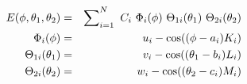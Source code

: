 \documentclass[12pt]{article}
\begin{document}
\pagestyle{empty}
\begin{eqnarray*}
E(\phi,\theta_1,\theta_2) & = &\sum_{i=1}^N\nolimits\ C_i\ \Phi_i(\phi)\ \Theta_{1i}(\theta_1)\ \Theta_{2i}(\theta_2)\\
\Phi_{i}(\phi)        & = &  u_i - \mathrm{cos}((\phi   - a_i)K_i) \\
\Theta_{1i}(\theta_1) & = &  v_i - \mathrm{cos}((\theta_1-b_i)L_i) \\
\Theta_{2i}(\theta_2) & = &  w_i - \mathrm{cos}((\theta_2-c_i)M_i)
\end{eqnarray*}

\pagestyle{empty}
\end{document}
